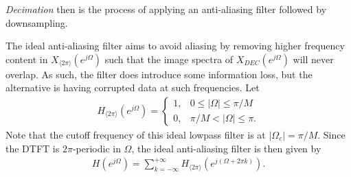 \documentclass{report}
\begin{document}
\pagebreak
\noindent\emph{Decimation} then is the process of applying an anti-aliasing filter followed by downsampling.
\begin{center}
\end{center}
The ideal anti-aliasing filter aims to avoid aliasing by removing higher frequency content in $X_{\langle 2\pi\rangle}(e^{j\Omega})$ such that the image spectra 
of $X_{DEC}(e^{j\Omega})$ will never overlap. As such, the filter does introduce some information loss, but the alternative is having corrupted data at such frequencies. 
Let 
\begin{align}
    H_{\langle 2\pi\rangle}(e^{j\Omega}) = 
    \begin{cases}
        1, & 0\leq|\Omega|\leq\pi/M \\
        0, & \pi/M<|\Omega|\leq\pi.
    \end{cases}
\end{align}
Note that the cutoff frequency of this ideal lowpass filter is at $|\Omega_c|=\pi/M$. Since the DTFT is $2\pi$-periodic in $\Omega$, the ideal anti-aliasing filter is then given by 
\begin{align}
    H(e^{j\Omega}) = \sum_{k=-\infty}^{+\infty} H_{\langle 2\pi\rangle}(e^{j(\Omega+2\pi k)}).
\end{align}
\end{document}
